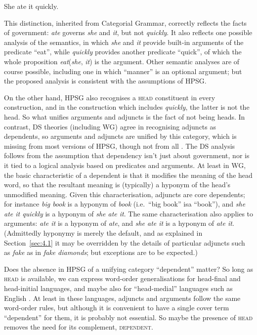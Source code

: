 \documentclass[output=paper
	        ,collection
	        ,collectionchapter
 	        ,biblatex
                ,babelshorthands
                ,newtxmath
                ,draftmode
                ,colorlinks, citecolor=brown
]{./langsci/langscibook}
\begin{document}
\begin{exe}
	\ex \label{ex:33} She ate it quickly.
\end{exe}

This distinction, inherited from Categorial Grammar, correctly reflects the facts of government: \emph{ate} governs \emph{she} and \emph{it}, but not \emph{quickly}. It also reflects one possible analysis of the semantics, in which \emph{she} and \emph{it} provide built-in arguments of the predicate ``eat'', while \emph{quickly} provides another predicate ``quick'', of which the whole proposition \emph{eat}(\emph{she}, \emph{it}) is the argument. Other semantic analyses are of course possible, including one in which ``manner'' is an optional argument; but the proposed analysis is consistent with the assumptions of HPSG.

On the other hand, HPSG also recognises a \textsc{head} constituent in every construction, and in the construction which includes \emph{quickly}, the latter is not the head. So what unifies arguments and adjuncts is the fact of not being heads. In contrast, DS theories (including WG) agree in recognising adjuncts as dependents, so arguments and adjuncts are unified by this category, which is missing from most versions of HPSG, though not from all \citep{BMS2001a}. The DS analysis follows from the assumption that dependency isn’t just about government, nor is it tied to a logical analysis based on predicates and arguments. At least in WG, the basic characteristic of a dependent is that it modifies the meaning of the head word, so that the resultant meaning is (typically) a hyponym of the head’s unmodified meaning. Given this characterisation, adjuncts are core dependents; for instance \emph{big book} is a hyponym of \emph{book} (i.e.\ ``big book'' isa ``book''), and \emph{she ate it quickly} is a hyponym of \emph{she ate it}. The same characterisation also applies to arguments: \emph{ate it} is a hyponym of \emph{ate}, and \emph{she ate it} is a hyponym of \emph{ate it}. (Admittedly hyponymy is merely the default, and as explained in Section~\ref{sec:4.1} it may be overridden by the details of particular adjuncts such as \emph{fake} as in \emph{fake diamonds}; but exceptions are to be expected.)

Does the absence in HPSG of a unifying category ``dependent'' matter? So long as \textsc{head} is available, we can express word-order generalisations for head-final and head-initial languages, and maybe also for ``head-medial'' languages such as English \citep[172]{Hudson2010b-u}. At least in these languages, adjuncts and arguments follow the same word-order rules, but although it is convenient to have a single cover term ``dependent'' for them, it is probably not essential. So maybe the presence of \textsc{head} removes the need for its complement, \textsc{dependent}.
\end{document}

